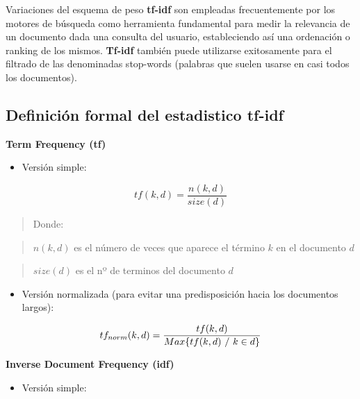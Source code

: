 \documentclass[
  11pt,
  a4paper,
]{article}
\providecommand{\tightlist}{%
  \setlength{\itemsep}{0pt}\setlength{\parskip}{0pt}}
\begin{document}
Variaciones del esquema de peso \textbf{tf-idf} son empleadas
frecuentemente por los motores de búsqueda como herramienta fundamental
para medir la relevancia de un documento dada una consulta del usuario,
estableciendo así una ordenación o ranking de los mismos.
\textbf{Tf-idf} también puede utilizarse exitosamente para el filtrado
de las denominadas stop-words (palabras que suelen usarse en casi todos
los documentos).

\hypertarget{definiciuxf3n-formal-del-estadistico-tf-idf}{%
\subsection{Definición formal del estadistico
tf-idf}\label{definiciuxf3n-formal-del-estadistico-tf-idf}}

\textbf{Term Frequency (tf)}

\begin{itemize}
\tightlist
\item
  Versión simple:
\end{itemize}

\[tf (k, d)= \dfrac{n(k,d)}{size(d)}\]

\begin{quote}
Donde:
\end{quote}

\begin{quote}
\(n(k, d)\) es el número de veces que aparece el término \(k\) en el
documento \(d\)
\end{quote}

\begin{quote}
\(size(d)\) es el nº de terminos del documento \(d\)
\end{quote}

\begin{itemize}
\tightlist
\item
  Versión normalizada (para evitar una predisposición hacia los
  documentos largos):
\end{itemize}

\[tf_{norm} (k, d)= \dfrac{tf(k,d)}{Max\lbrace tf(k,d) \hspace{0.12cm} /\hspace{0.12cm} k \in d  \rbrace}\]

\textbf{Inverse Document Frequency (idf)}

\begin{itemize}
\tightlist
\item
  Versión simple:
\end{itemize}
\end{document}
